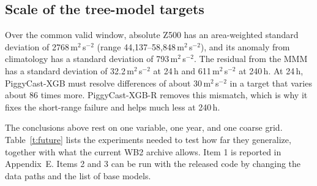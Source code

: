 \documentclass[twocol]{ametsocV6.1}
\newcommand{\units}{m$^{2}$\,s$^{-2}$}
\newcommand{\Zfive}{Z500}
\newcommand{\PCXGB}{PiggyCast-XGB}
\newcommand{\PCXGBR}{PiggyCast-XGB-R}
\begin{document}
\subsection{Scale of the tree-model targets}

Over the common valid window, absolute \Zfive{} has an area-weighted standard deviation of 2768\,\units{} (range 44{,}137--58{,}848\,\units), and its anomaly from climatology has a standard deviation of 793\,\units. The residual from the MMM has a standard deviation of 32.2\,\units{} at 24\,h and 611\,\units{} at 240\,h. At 24\,h, \PCXGB{} must resolve differences of about 30\,\units{} in a target that varies about 86 times more. \PCXGBR{} removes this mismatch, which is why it fixes the short-range failure and helps much less at 240\,h.

\appendix[D]


The conclusions above rest on one variable, one year, and one coarse grid. Table~\ref{t:future} lists the experiments needed to test how far they generalize, together with what the current WB2 archive allows. Item 1 is reported in Appendix~E. Items 2 and 3 can be run with the released code by changing the data paths and the list of base models.
\end{document}
